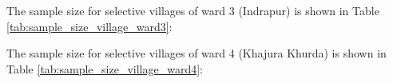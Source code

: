 The sample size for selective villages of ward 3 (Indrapur) is shown in Table \ref{tab:sample_size_village_ward3}:

\begin{table}[h]
\centering
\caption{Sample Size of Selective Village of Ward 3 (Indrapur)}
\label{tab:sample_size_village_ward3}
\end{table}

The sample size for selective villages of ward 4 (Khajura Khurda) is shown in Table \ref{tab:sample_size_village_ward4}:

\begin{table}[h]
\centering
\caption{Sample Size of Selective Village of Ward 4 (Khajura Khurda)}
\label{tab:sample_size_village_ward4}
\end{table}

